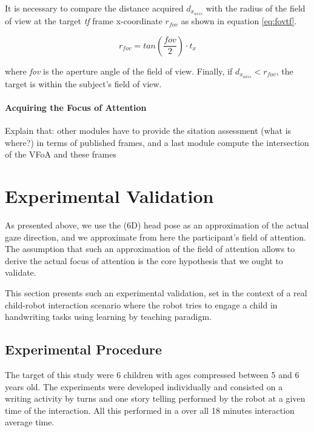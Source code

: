 \documentclass{sig-alternate}
\begin{document}
It is necessary to compare the distance acquired $ d_{x_{axis}} $ with the
radius of the field of view at the target \textit{tf} frame x-coordinate $
r_{fov} $ as shown in equation \ref{eq:fovtf}.

\begin{equation}
r_{fov} = tan\left(\frac{fov}{2}\right) \cdot t_x
\label{eq:fovtf}
\end{equation}

where \textit{fov} is the aperture angle of the field of view. Finally, if $
d_{x_{axis}}<r_{fov} $, the target is within the subject's field of view.


\paragraph{Acquiring the Focus of Attention}

Explain that: other modules have to provide the sitation assessment (what
is where?) in terms of published frames, and a last module compute the
intersection of the VFoA and these frames

\section{Experimental Validation}

As presented above, we use the (6D) head pose as an approximation of the
actual gaze direction, and we approximate from here the participant's field of
attention. The assumption that such an approximation of the field of attention
allows to derive the actual focus of attention is the core hypothesis that we
ought to validate.

This section presents such an experimental validation, set in the context of a
real child-robot interaction scenario where the robot tries to engage a child in
handwriting tasks using learning by teaching paradigm.

\subsection{Experimental Procedure}

The target of this study were 6 children with ages compressed between 5 and 6
years old. The experiments were developed individually and consisted on a
writing activity by turns and one story telling performed by the robot at a
given time of the interaction. All this performed in a over all 18 minutes
interaction average time.
\end{document}
